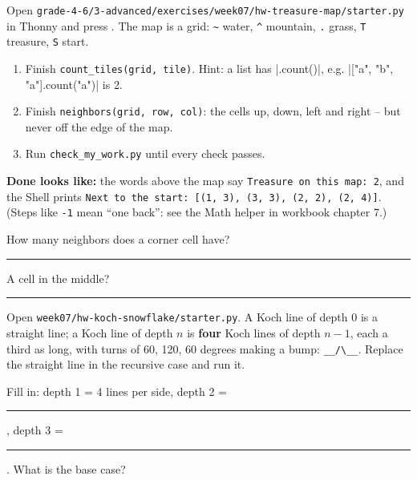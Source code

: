 \namedateline

\begin{core}
Open \texttt{grade-4-6/3-advanced/exercises/week07/hw-treasure-map/starter.py} in Thonny and press . The map is a grid:
\texttt{\textasciitilde} water, \texttt{\textasciicircum} mountain, \texttt{.} grass, \texttt{T} treasure, \texttt{S} start.
\begin{enumerate}[itemsep=1pt]
  \item Finish \texttt{count\_tiles(grid, tile)}. Hint: a list has \py|.count()|, e.g. \py|["a", "b", "a"].count("a")| is 2.
  \item Finish \texttt{neighbors(grid, row, col)}: the cells up, down, left and right -- but never off the edge of the map.
  \item Run \texttt{check\_my\_work.py} until every check passes.
\end{enumerate}
\textbf{Done looks like:} the words above the map say \texttt{Treasure on this map: 2}, and the Shell prints \texttt{Next to the start: [(1, 3), (3, 3), (2, 2), (2, 4)]}. (Steps like \texttt{-1} mean \enquote{one back}: see the Math helper in workbook chapter 7.)

How many neighbors does a corner cell have? \rule{1.5cm}{0.4pt} \quad A cell in the middle? \rule{1.5cm}{0.4pt}
\end{core}

\begin{challenge}
Open \texttt{week07/hw-koch-snowflake/starter.py}. A Koch line of depth 0 is a straight line; a Koch line of depth $n$ is \textbf{four} Koch lines of depth $n-1$, each a third as long, with turns of 60, 120, 60 degrees making a bump: \texttt{\_\_/\textbackslash\_\_}. Replace the straight line in the recursive case and run it.

Fill in: depth 1 = 4 lines per side, depth 2 = \rule{1cm}{0.4pt}, depth 3 = \rule{1cm}{0.4pt}. What is the base case? 
\end{challenge}

